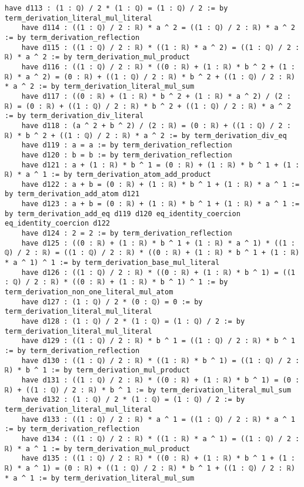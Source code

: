 \documentclass{article}
\begin{document}
\begin{tcolorbox}[colback=white!10, width=\linewidth]
\begin{lstlisting}[language=Lean4]
    have d113 : (1 : ℚ) / 2 * (1 : ℚ) = (1 : ℚ) / 2 := by term_derivation_literal_mul_literal
    have d114 : ((1 : ℚ) / 2 : ℝ) * a ^ 2 = ((1 : ℚ) / 2 : ℝ) * a ^ 2 := by term_derivation_reflection
    have d115 : ((1 : ℚ) / 2 : ℝ) * ((1 : ℝ) * a ^ 2) = ((1 : ℚ) / 2 : ℝ) * a ^ 2 := by term_derivation_mul_product
    have d116 : ((1 : ℚ) / 2 : ℝ) * ((0 : ℝ) + (1 : ℝ) * b ^ 2 + (1 : ℝ) * a ^ 2) = (0 : ℝ) + ((1 : ℚ) / 2 : ℝ) * b ^ 2 + ((1 : ℚ) / 2 : ℝ) * a ^ 2 := by term_derivation_literal_mul_sum
    have d117 : ((0 : ℝ) + (1 : ℝ) * b ^ 2 + (1 : ℝ) * a ^ 2) / (2 : ℝ) = (0 : ℝ) + ((1 : ℚ) / 2 : ℝ) * b ^ 2 + ((1 : ℚ) / 2 : ℝ) * a ^ 2 := by term_derivation_div_literal
    have d118 : (a ^ 2 + b ^ 2) / (2 : ℝ) = (0 : ℝ) + ((1 : ℚ) / 2 : ℝ) * b ^ 2 + ((1 : ℚ) / 2 : ℝ) * a ^ 2 := by term_derivation_div_eq
    have d119 : a = a := by term_derivation_reflection
    have d120 : b = b := by term_derivation_reflection
    have d121 : a + (1 : ℝ) * b ^ 1 = (0 : ℝ) + (1 : ℝ) * b ^ 1 + (1 : ℝ) * a ^ 1 := by term_derivation_atom_add_product
    have d122 : a + b = (0 : ℝ) + (1 : ℝ) * b ^ 1 + (1 : ℝ) * a ^ 1 := by term_derivation_add_atom d121
    have d123 : a + b = (0 : ℝ) + (1 : ℝ) * b ^ 1 + (1 : ℝ) * a ^ 1 := by term_derivation_add_eq d119 d120 eq_identity_coercion eq_identity_coercion d122
    have d124 : 2 = 2 := by term_derivation_reflection
    have d125 : ((0 : ℝ) + (1 : ℝ) * b ^ 1 + (1 : ℝ) * a ^ 1) * ((1 : ℚ) / 2 : ℝ) = ((1 : ℚ) / 2 : ℝ) * ((0 : ℝ) + (1 : ℝ) * b ^ 1 + (1 : ℝ) * a ^ 1) ^ 1 := by term_derivation_base_mul_literal
    have d126 : ((1 : ℚ) / 2 : ℝ) * ((0 : ℝ) + (1 : ℝ) * b ^ 1) = ((1 : ℚ) / 2 : ℝ) * ((0 : ℝ) + (1 : ℝ) * b ^ 1) ^ 1 := by term_derivation_non_one_literal_mul_atom
    have d127 : (1 : ℚ) / 2 * (0 : ℚ) = 0 := by term_derivation_literal_mul_literal
    have d128 : (1 : ℚ) / 2 * (1 : ℚ) = (1 : ℚ) / 2 := by term_derivation_literal_mul_literal
    have d129 : ((1 : ℚ) / 2 : ℝ) * b ^ 1 = ((1 : ℚ) / 2 : ℝ) * b ^ 1 := by term_derivation_reflection
    have d130 : ((1 : ℚ) / 2 : ℝ) * ((1 : ℝ) * b ^ 1) = ((1 : ℚ) / 2 : ℝ) * b ^ 1 := by term_derivation_mul_product
    have d131 : ((1 : ℚ) / 2 : ℝ) * ((0 : ℝ) + (1 : ℝ) * b ^ 1) = (0 : ℝ) + ((1 : ℚ) / 2 : ℝ) * b ^ 1 := by term_derivation_literal_mul_sum
    have d132 : (1 : ℚ) / 2 * (1 : ℚ) = (1 : ℚ) / 2 := by term_derivation_literal_mul_literal
    have d133 : ((1 : ℚ) / 2 : ℝ) * a ^ 1 = ((1 : ℚ) / 2 : ℝ) * a ^ 1 := by term_derivation_reflection
    have d134 : ((1 : ℚ) / 2 : ℝ) * ((1 : ℝ) * a ^ 1) = ((1 : ℚ) / 2 : ℝ) * a ^ 1 := by term_derivation_mul_product
    have d135 : ((1 : ℚ) / 2 : ℝ) * ((0 : ℝ) + (1 : ℝ) * b ^ 1 + (1 : ℝ) * a ^ 1) = (0 : ℝ) + ((1 : ℚ) / 2 : ℝ) * b ^ 1 + ((1 : ℚ) / 2 : ℝ) * a ^ 1 := by term_derivation_literal_mul_sum

\end{lstlisting}
\end{tcolorbox}
\end{document}
